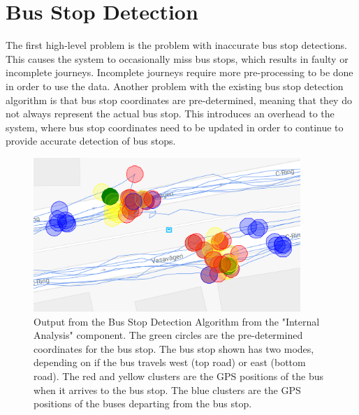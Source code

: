 \chapter{Bus Stop Detection}
\label{cha:bus-stop-detection}

The first high-level problem is the problem with inaccurate bus stop detections.
This causes the system to occasionally miss bus stops, which results in faulty or incomplete journeys.
Incomplete journeys require more pre-processing to be done in order to use the data.
Another problem with the existing bus stop detection algorithm is that bus stop coordinates are pre-determined, meaning that they do not always represent the actual bus stop.
This introduces an overhead to the system, where bus stop coordinates need to be updated in order to continue to provide accurate detection of bus stops.

\begin{figure}[ht!]
    \centering
    \includegraphics[width=0.9\textwidth]{figures/bus_stops}
    \caption{Output from the Bus Stop Detection Algorithm from the "Internal Analysis" component.
    The green circles are the pre-determined coordinates for the bus stop.
    The bus stop shown has two modes, depending on if the bus travels west (top road) or east (bottom road).
    The red and yellow clusters are the GPS positions of the bus when it arrives to the bus stop.
    The blue clusters are the GPS positions of the buses departing from the bus stop.
    }
    \label{fig:bus-stop-clusters}
\end{figure}


